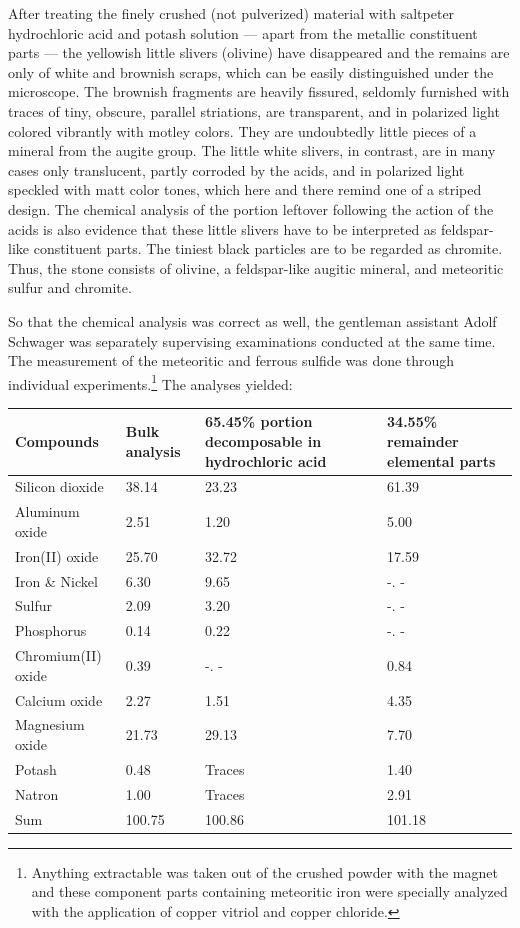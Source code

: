\documentclass[a4paper, 12pt, oneside]{article}
\begin{document}
After treating the finely crushed (not pulverized) material with saltpeter hydrochloric acid and potash solution --- apart from the metallic constituent parts --- the yellowish little slivers (olivine) have disappeared and the remains are only of white and brownish scraps, which can be easily distinguished under the microscope. The brownish fragments are heavily fissured, seldomly furnished with traces of tiny, obscure, parallel striations, are transparent, and in polarized light colored vibrantly with motley colors. They are undoubtedly little pieces of a mineral from the augite group. The little white slivers, in contrast, are in many cases only translucent, partly corroded by the acids, and in polarized light speckled with matt color tones, which here and there remind one of a striped design. The chemical analysis of the portion leftover following the action of the acids is also evidence that these little slivers have to be interpreted as feldspar-like constituent parts. The tiniest black particles are to be regarded as chromite. Thus, the stone consists of olivine, a feldspar-like augitic mineral, and meteoritic sulfur and chromite.

So that the chemical analysis was correct as well, the gentleman assistant Adolf Schwager was separately supervising examinations conducted at the same time. The measurement of the meteoritic and ferrous sulfide was done through individual experiments.\footnote{Anything extractable was taken out of the crushed powder with the magnet and these component parts containing meteoritic iron were specially analyzed with the application of copper vitriol and copper chloride.} The analyses yielded:
\begin{center}
    \tiny
    \begin{tabular}{ |l|p{1.5cm}|p{1.5cm}|p{1.5cm}| }
    \hline
    Compounds & Bulk analysis & 65.45\% portion decomposable in hydrochloric acid & 34.55\% remainder elemental parts\\\hline
    Silicon dioxide & 38.14 & 23.23 & 61.39\\\hline
    Aluminum oxide & 2.51 & 1.20 & 5.00\\\hline
    Iron(II) oxide & 25.70 & 32.72 & 17.59\\\hline
    Iron \& Nickel & 6.30 & 9.65 & -. -\\\hline
    Sulfur & 2.09 & 3.20 & -. -\\\hline
    Phosphorus & 0.14 & 0.22 & -. -\\\hline
    Chromium(II) oxide & 0.39 & -. - & 0.84\\\hline
    Calcium oxide & 2.27 & 1.51 & 4.35\\\hline
    Magnesium oxide & 21.73 & 29.13 & 7.70\\\hline
    Potash & 0.48 & Traces & 1.40\\\hline
    Natron & 1.00 & Traces & 2.91\\\hline
    Sum & 100.75 & 100.86 & 101.18\\
    \hline
    \end{tabular}
\end{center}
\end{document}
